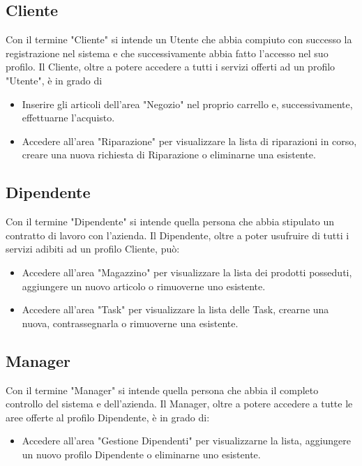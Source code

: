 \documentclass{report}
\begin{document}
\subsection*{Cliente}

Con il termine "Cliente" si intende un Utente che abbia compiuto con successo la registrazione nel sistema e che successivamente abbia fatto l'accesso nel suo profilo. Il Cliente, oltre a potere accedere a tutti i servizi offerti ad un profilo "Utente", è in grado di
\begin{itemize}
	\item Inserire gli articoli dell'area "Negozio" nel proprio carrello e, successivamente, effettuarne l'acquisto.
	\item Accedere all'area "Riparazione" per visualizzare la lista di riparazioni in corso, creare una nuova richiesta di Riparazione o eliminarne una esistente.
\end{itemize}
\subsection*{Dipendente}

Con il termine "Dipendente" si intende quella persona che abbia stipulato un contratto di lavoro con l'azienda. Il Dipendente, oltre a poter usufruire di tutti i servizi adibiti ad un profilo Cliente, può:
\begin{itemize}
	\item Accedere all'area "Magazzino" per visualizzare la lista dei prodotti posseduti, aggiungere un nuovo articolo o rimuoverne uno esistente.
	\item Accedere all'area "Task" per visualizzare la lista delle Task, crearne una nuova, contrassegnarla o rimuoverne una esistente. 
\end{itemize}

\subsection*{Manager}

Con il termine "Manager" si intende quella persona che abbia il completo controllo del sistema e dell'azienda. Il Manager, oltre a potere accedere a tutte le aree offerte al profilo Dipendente, è in grado di:
\begin{itemize}
	\item Accedere all'area "Gestione Dipendenti" per visualizzarne la lista, aggiungere un nuovo profilo Dipendente o eliminarne uno esistente.
\end{itemize}
\end{document}

